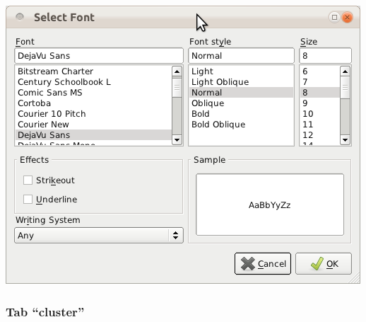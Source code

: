 \includegraphics[scale=0.33]{gui_pictures/Capture-DIYABC-101} \\



\subsubsection{Tab \textsf{``cluster''}}

